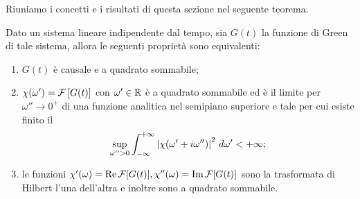 Riuniamo i concetti e i risultati di questa sezione nel seguente teorema.

\begin{theorem}[ di Titchmarsh ]
  Dato un sistema lineare indipendente dal tempo, sia $ G(t) $ la funzione di Green di tale sistema, allora le seguenti proprietà sono equivalenti:
  \begin{enumerate}
    \item $ G(t) $ è causale e a quadrato sommabile;
    \item $ \chi(\omega') = \operatorname{\mathcal{F}}\left[ G(t) \right] $ con $ \omega' \in \mathbb{R} $ è a quadrato sommabile ed è il limite per $ \omega'' \to 0^+ $ di una funzione 
    analitica nel semipiano superiore e tale per cui esiste finito il 
    \begin{align}
      \sup_{\omega'' > 0} \int_{-\infty}^{+\infty} \left|{\chi(\omega' + i \omega'')}\right|^2 \, d\omega' < +\infty;
    \end{align}
    \item le funzioni $ \chi'(\omega) = \text{Re} \operatorname{\mathcal{F}}[G(t)], \chi''(\omega) = \text{Im} \operatorname{\mathcal{F}}[G(t)] $ sono la trasformata di Hilbert l'una dell'altra e 
    inoltre sono a quadrato sommabile.
  \end{enumerate}
\end{theorem}
